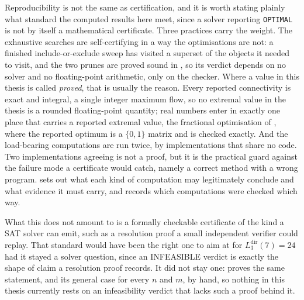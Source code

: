 Reproducibility is not the same as certification, and it is worth stating plainly what standard the computed results here meet, since a solver reporting \texttt{OPTIMAL} is not by itself a mathematical certificate. Three practices carry the weight. The exhaustive searches are self-certifying in a way the optimisations are not: a finished include-or-exclude sweep has visited a superset of the objects it needed to visit, and the two prunes are proved sound in , so its verdict depends on no solver and no floating-point arithmetic, only on the checker. Where a value in this thesis is called \emph{proved}, that is usually the reason. Every reported connectivity is exact and integral, a single integer maximum flow, so no extremal value in the thesis is a rounded floating-point quantity; real numbers enter in exactly one place that carries a reported extremal value, the fractional optimisation of , where the reported optimum is a $\{0,1\}$ matrix and is checked exactly. And the load-bearing computations are run twice, by implementations that share no code. Two implementations agreeing is not a proof, but it is the practical guard against the failure mode a certificate would catch, namely a correct method with a wrong program.  sets out what each kind of computation may legitimately conclude and what evidence it must carry, and  records which computations were checked which way.

What this does not amount to is a formally checkable certificate of the kind a SAT solver can emit, such as a resolution proof a small independent verifier could replay. That standard would have been the right one to aim at for $L_3^{\mathrm{dir}}(7) = 24$ had it stayed a solver question, since an INFEASIBLE verdict is exactly the shape of claim a resolution proof records. It did not stay one:  proves the same statement, and its general case for every $n$ and $m$, by hand, so nothing in this thesis currently rests on an infeasibility verdict that lacks such a proof behind it.
